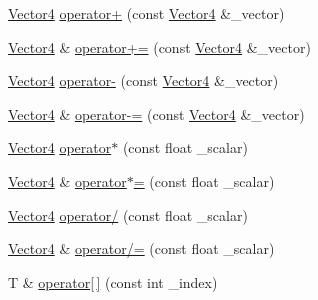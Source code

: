 \begin{DoxyCompactItemize}
\mbox{\hyperlink{structpad_1_1math_1_1_vector4}{Vector4}} \mbox{\hyperlink{structpad_1_1math_1_1_vector4_ac6b2370ae62f75e3dcb112427e3f518f}{operator+}} (const \mbox{\hyperlink{structpad_1_1math_1_1_vector4}{Vector4}} \&\+\_\+vector)
\item 
\mbox{\hyperlink{structpad_1_1math_1_1_vector4}{Vector4}} \& \mbox{\hyperlink{structpad_1_1math_1_1_vector4_aed8f9c0faacfe13f7985d5f4e4f73d23}{operator+=}} (const \mbox{\hyperlink{structpad_1_1math_1_1_vector4}{Vector4}} \&\+\_\+vector)
\item 
\mbox{\hyperlink{structpad_1_1math_1_1_vector4}{Vector4}} \mbox{\hyperlink{structpad_1_1math_1_1_vector4_a05cc7e4f760aae9610025584d1608b50}{operator-\/}} (const \mbox{\hyperlink{structpad_1_1math_1_1_vector4}{Vector4}} \&\+\_\+vector)
\item 
\mbox{\hyperlink{structpad_1_1math_1_1_vector4}{Vector4}} \& \mbox{\hyperlink{structpad_1_1math_1_1_vector4_ae27aa6827d54b1b0033ee99e79d19660}{operator-\/=}} (const \mbox{\hyperlink{structpad_1_1math_1_1_vector4}{Vector4}} \&\+\_\+vector)
\item 
\mbox{\hyperlink{structpad_1_1math_1_1_vector4}{Vector4}} \mbox{\hyperlink{structpad_1_1math_1_1_vector4_a57e32bb850ebd1b9ac4a6adf36ebfbe4}{operator$\ast$}} (const float \+\_\+scalar)
\item 
\mbox{\hyperlink{structpad_1_1math_1_1_vector4}{Vector4}} \& \mbox{\hyperlink{structpad_1_1math_1_1_vector4_a33fee52eb7633acd92f85449d261b820}{operator$\ast$=}} (const float \+\_\+scalar)
\item 
\mbox{\hyperlink{structpad_1_1math_1_1_vector4}{Vector4}} \mbox{\hyperlink{structpad_1_1math_1_1_vector4_ad818def83cbc4255b79ec185450633ca}{operator/}} (const float \+\_\+scalar)
\item 
\mbox{\hyperlink{structpad_1_1math_1_1_vector4}{Vector4}} \& \mbox{\hyperlink{structpad_1_1math_1_1_vector4_a3703b229047d4cd251215a409c8ad7a5}{operator/=}} (const float \+\_\+scalar)
\item 
T \& \mbox{\hyperlink{structpad_1_1math_1_1_vector4_aaf150bc0a3a170ca7b8bde7892e20c66}{operator\mbox{[}$\,$\mbox{]}}} (const int \+\_\+index)
\end{DoxyCompactItemize}
